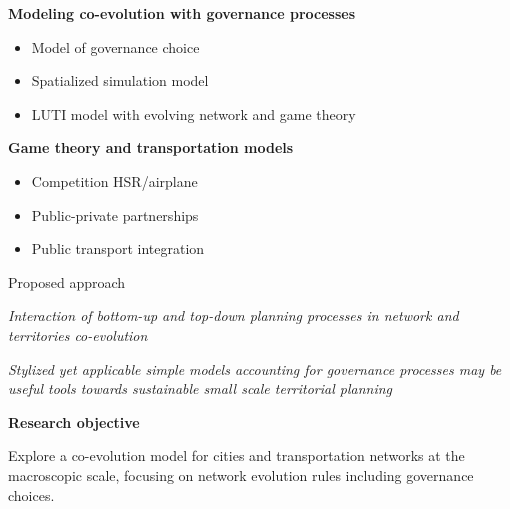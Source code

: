 \documentclass[12pt]{iopart}
\begin{document}
\textbf{Modeling co-evolution with governance processes}



\begin{itemize}
	\item Model of governance choice \cite{Xie2011}
	\item Spatialized simulation model \cite{xie2011governance} 
	\item LUTI model with evolving network and game theory \cite{le2015modeling}
\end{itemize}



\textbf{Game theory and transportation models}


\begin{itemize}
	\item Competition HSR/airplane \cite{adler2010high} 
	\item Public-private partnerships \cite{medda2007game} 
	\item Public transport integration \cite{roumboutsos2008game}
\end{itemize}





Proposed approach




\textit{Interaction of bottom-up and top-down planning processes in network and territories co-evolution}

\medskip

 \textit{Stylized yet applicable simple models accounting for governance processes may be useful tools towards sustainable small scale territorial planning}



\textbf{Research objective}

Explore a co-evolution model for cities and transportation networks at the macroscopic scale, focusing on network evolution rules including governance choices.
\end{document}

